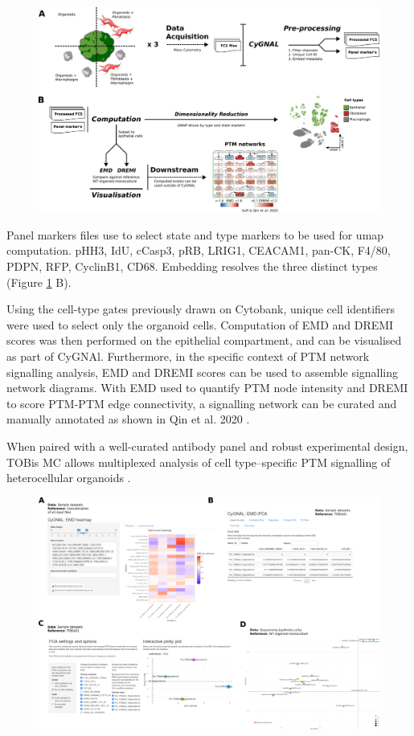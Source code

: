 \begin{figure}
    \centering
    \includegraphics{03cytof/figs/3CYGNAL_usage.png}
    \caption{}
    \label{fig:3cyguse}
\end{figure}

Panel markers files use to select state and type markers to be used for umap computation. pHH3, IdU, cCasp3, pRB, LRIG1, CEACAM1, pan-CK, F4/80, PDPN, RFP, CyclinB1, CD68. Embedding resolves the three distinct types (Figure \ref{fig:3cyguse} B).

Using the cell-type gates previously drawn on Cytobank, unique cell identifiers were used to select only the organoid cells. Computation of EMD and DREMI scores was then performed on the epithelial compartment, and can be visualised as part of CyGNAl. Furthermore, in the specific context of PTM network signalling analysis, EMD and DREMI scores can be used to assemble signalling network diagrams. With EMD used to quantify PTM node intensity and DREMI to score PTM-PTM edge connectivity, a signalling network can be curated and manually annotated as shown in Qin et al. 2020 \cite{qin_cell-type-specific_2020}. 

When paired with a well-curated antibody panel and robust experimental design, TOBis MC allows multiplexed analysis of cell type–specific PTM signalling of heterocellular organoids \cite{sufi_multiplexed_2021}. 

\begin{figure}
    \centering
    \includegraphics{03cytof/figs/3CYGNAL_usageVIS.png}
    \caption{}
    \label{fig:3cygvis}
\end{figure}

